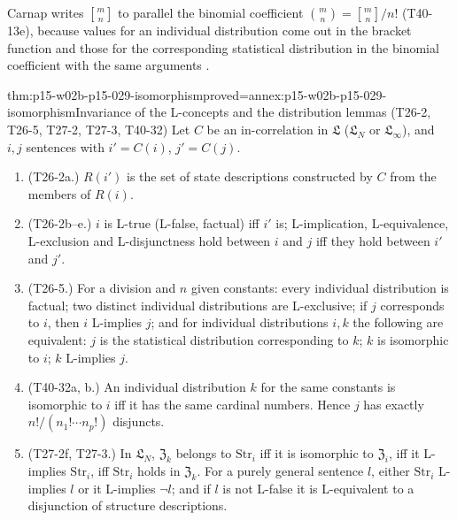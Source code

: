 Carnap writes \(\genfrac{[}{]}{0pt}{}{m}{n}\) to parallel the binomial
coefficient \(\binom mn=\genfrac{[}{]}{0pt}{}{m}{n}/n!\) (T40-13e), because
values for an individual distribution come out in the bracket function
and those for the corresponding statistical distribution in the
binomial coefficient with the same arguments
\cite[D40-3, T40-12, T40-13, p.~152; sec.~92, p.~492]{Carnap1950Probability}.

\begin{hblemma}{thm:p15-w02b-p15-029-isomorphism}{proved=annex:p15-w02b-p15-029-isomorphism}{Invariance of the L-concepts and the distribution lemmas (T26-2, T26-5, T27-2, T27-3, T40-32)}
Let \(C\) be an in-correlation in \(\mathfrak L\) (\(\mathfrak L_N\) or
\(\mathfrak L_\infty\)), and \(i,j\) sentences with \(i'=C(i)\),
\(j'=C(j)\).
\begin{enumerate}
 \item (T26-2a.) \(R(i')\) is the set of state descriptions constructed
       by \(C\) from the members of \(R(i)\).
 \item (T26-2b--e.) \(i\) is L-true (L-false, factual) iff \(i'\) is;
       L-implication, L-equivalence, L-exclusion and L-disjunctness hold
       between \(i\) and \(j\) iff they hold between \(i'\) and \(j'\).
 \item (T26-5.) For a division and \(n\) given constants: every
       individual distribution is factual; two distinct individual
       distributions are L-exclusive; if \(j\) corresponds to \(i\),
       then \(i\) L-implies \(j\); and for individual distributions
       \(i,k\) the following are equivalent: \(j\) is the statistical
       distribution corresponding to \(k\); \(k\) is isomorphic to
       \(i\); \(k\) L-implies \(j\).
 \item (T40-32a, b.) An individual distribution \(k\) for the same
       constants is isomorphic to \(i\) iff it has the same cardinal
       numbers. Hence \(j\) has exactly \(n!/(n_1!\cdots n_p!)\)
       disjuncts.
 \item (T27-2f, T27-3.) In \(\mathfrak L_N\), \(\mathfrak Z_k\) belongs
       to \(\mathrm{Str}_i\) iff it is isomorphic to \(\mathfrak Z_i\),
       iff it L-implies \(\mathrm{Str}_i\), iff \(\mathrm{Str}_i\)
       holds in \(\mathfrak Z_k\). For a purely general sentence \(l\),
       either \(\mathrm{Str}_i\) L-implies \(l\) or it L-implies
       \(\neg l\); and if \(l\) is not L-false it is L-equivalent to a
       disjunction of structure descriptions.
\end{enumerate}
\end{hblemma}

